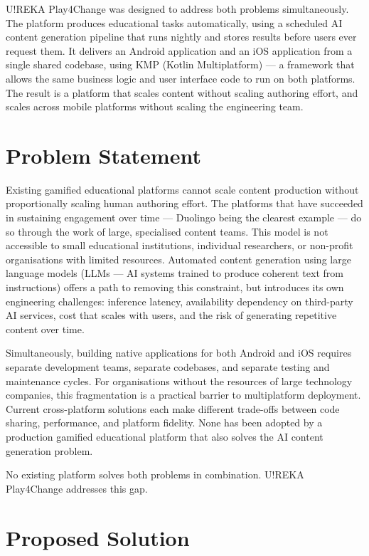 U!REKA Play4Change was designed to address both problems simultaneously. The platform produces educational tasks automatically, using a scheduled AI content generation pipeline that runs nightly and stores results before users ever request them. It delivers an Android application and an iOS application from a single shared codebase, using KMP (Kotlin Multiplatform) --- a framework that allows the same business logic and user interface code to run on both platforms. The result is a platform that scales content without scaling authoring effort, and scales across mobile platforms without scaling the engineering team.

\section{Problem Statement}

Existing gamified educational platforms cannot scale content production without proportionally scaling human authoring effort. The platforms that have succeeded in sustaining engagement over time --- Duolingo being the clearest example --- do so through the work of large, specialised content teams. This model is not accessible to small educational institutions, individual researchers, or non-profit organisations with limited resources. Automated content generation using large language models (LLMs --- AI systems trained to produce coherent text from instructions) offers a path to removing this constraint, but introduces its own engineering challenges: inference latency, availability dependency on third-party AI services, cost that scales with users, and the risk of generating repetitive content over time.

Simultaneously, building native applications for both Android and iOS requires separate development teams, separate codebases, and separate testing and maintenance cycles. For organisations without the resources of large technology companies, this fragmentation is a practical barrier to multiplatform deployment. Current cross-platform solutions each make different trade-offs between code sharing, performance, and platform fidelity. None has been adopted by a production gamified educational platform that also solves the AI content generation problem.

No existing platform solves both problems in combination. U!REKA Play4Change addresses this gap.

\section{Proposed Solution}

